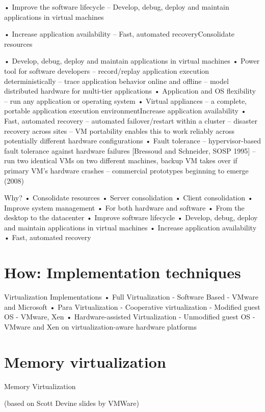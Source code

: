 \documentclass[10pt]{article}
\begin{document}
•  Improve the software lifecycle
–  Develop, debug, deploy and maintain
applications in virtual machines

•  Increase application availability
–  Fast, automated recoveryConsolidate resources


•  Develop, debug, deploy and maintain
applications in virtual machines
•  Power tool for software developers
–  record/replay application execution deterministically
–  trace application behavior online and offline
–  model distributed hardware for multi-tier applications
•  Application and OS flexibility
–  run any application or operating system
•  Virtual appliances
–  a complete, portable application execution
environmentIncrease application availability
•  Fast, automated recovery
–  automated failover/restart within a cluster
–  disaster recovery across sites
–  VM portability enables this to work reliably across
potentially different hardware configurations
•  Fault tolerance
–  hypervisor-based fault tolerance against hardware
failures [Bressoud and Schneider, SOSP 1995]
–  run two identical VMs on two different machines,
backup VM takes over if primary VM’s hardware
crashes
–  commercial prototypes beginning to emerge (2008)

Why?
• Consolidate resources
• Server consolidation
• Client consolidation
• Improve system management
• For both hardware and software
• From the desktop to the datacenter
• Improve software lifecycle
• Develop, debug, deploy and maintain applications in virtual
machines
• Increase application availability
• Fast, automated recovery

\section{How: Implementation techniques}

Virtualization Implementations
• Full Virtualization
- Software Based
- VMware and Microsoft
• Para Virtualization
- Cooperative virtualization
- Modified guest OS
- VMware, Xen
• Hardware-assisted Virtualization
- Unmodified guest OS
- VMware and Xen on virtualization-aware hardware platforms

\section{Memory virtualization}

Memory Virtualization

(based on Scott Devine slides by VMWare)
\end{document}
